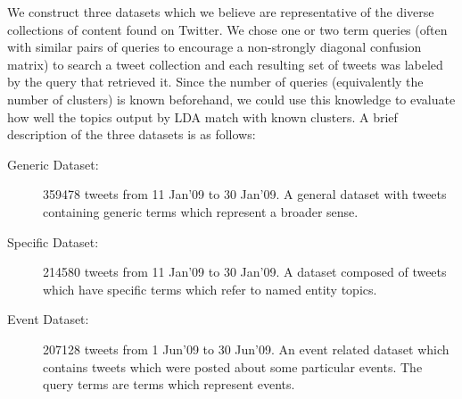 \documentclass{sig-alternate}
\begin{document}
We construct three datasets which we believe are representative of the
diverse collections of content found on Twitter.  We chose one or
two term queries (often with similar pairs of queries to encourage
a non-strongly diagonal confusion matrix) to search a tweet
collection and each resulting set of tweets was labeled by the query
that retrieved it.  Since the number of queries (equivalently the
number of clusters) is known beforehand, we could use this knowledge
to evaluate how well the topics output by LDA match with known
clusters. A brief description of the three datasets is as
follows:

\begin{description}
\item[Generic Dataset: ]
 359478 tweets from 11 Jan'09 to 30 Jan'09.
A general dataset with tweets containing generic terms which represent a broader sense.\vspace{-5pt}
\item[Specific Dataset: ]
214580 tweets from 11 Jan'09 to 30 Jan'09.
A dataset composed of tweets which have specific terms which refer to named entity topics.\vspace{-5pt}
\item[Event Dataset: ]
207128 tweets from 1 Jun'09 to 30 Jun'09.
An event related dataset which contains tweets which were posted about some particular events. The query terms are terms which represent events.
\end{description}
\end{document}
